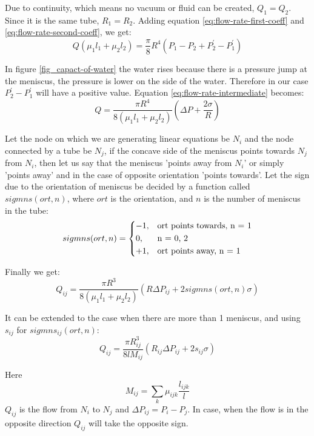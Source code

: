 	Due to continuity, which means no vacuum or fluid can be created, $Q_1 = Q_2$. Since it is the same tube, $R_1 = R_2$. Adding equation \ref{eq:flow-rate-first-coeff} and \ref{eq:flow-rate-second-coeff}, we get:
	\begin{equation} \label{eq:flow-rate-intermediate}
	Q({\mu}_1 l_1 + {\mu}_2 l_2) = \frac{\pi}{8}R^4(P_1 - P_2 + P^{'}_2 - P^{'}_1)
	\end{equation}

	In figure \ref{fig_capact-of-water} the water rises because there is a pressure jump at the meniscus, the pressure is lower on the side of the water. Therefore in our case $P^{'}_2 - P^{'}_1$ will have a positive value. Equation \ref{eq:flow-rate-intermediate} becomes:
	\begin{equation}
	Q = \frac{\pi R^4}{8({\mu}_1 l_1 + {\mu}_2 l_2)}(\Delta P + \frac{2\sigma}{R})
	\end{equation}

	Let the node on which we are generating linear equations be $N_i$ and the node connected by a tube be $N_j$, if the concave side of the meniscus points towards $N_j$ from $N_i$, then let us say that the meniscus 'points away from $N_i$' or simply 'points away' and in the case of opposite orientation 'points towards'. Let the sign due to the orientation of meniscus be decided by a function called $sigmns(ort, n)$, where $ort$ is the orientation, and $n$ is the number of meniscus in the tube:
	\begin{equation}
	sigmns(ort, n) = 
	\begin{dcases}
	-1,&\text{ort points towards, n = 1}\\
	0,&\text{n = 0, 2}\\
	+1,&\text{ort points away, n = 1}
	\end{dcases}
	\end{equation}

	Finally we get:
	\begin{equation} 
	Q_{ij} = \frac{\pi R^3}{8({\mu}_1 l_1 + {\mu}_2 l_2)}(R\Delta P_{ij} + 2sigmns(ort, n)\sigma)
	\end{equation}

	It can be extended to the case when there are more than 1 meniscus, and using $s_{ij}$ for $sigmns_{ij}(ort, n)$:
	\begin{equation} \label{eq:flow-rate-main}
	\boxed{Q_{ij} = \frac{\pi R_{ij}^3}{8lM_{ij}}(R_{ij}\Delta P_{ij} + 2s_{ij}\sigma)}
	\end{equation}

	Here
	\[ M_{ij} = \sum\limits_{k}{\mu}_{ijk} \frac{l_{ijk}}{l} \]
	$Q_{ij}$ is the flow from $N_i$ to $N_j$ and $\Delta P_{ij} = P_i - P_j$. In case, when the flow is in the opposite direction $Q_{ij}$ will take the opposite sign.

